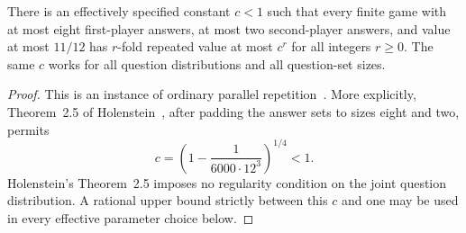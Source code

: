 \begin{theorem}\label{thm:parallel-repetition}
There is an effectively specified constant $c<1$ such that every finite game
with at most eight first-player answers, at most two second-player answers,
and value at most $11/12$ has $r$-fold repeated value at most $c^r$ for all
integers $r\ge0$. The same $c$ works for all question distributions and all
question-set sizes.
\end{theorem}
\begin{proof}
This is an instance of ordinary parallel repetition~\cite{Raz1998}.
More explicitly, Theorem~2.5 of Holenstein~\cite{Holenstein2009}, after padding
the answer sets to sizes eight and two, permits
\[
 c=\left(1-\frac1{6000\cdot12^3}\right)^{1/4}<1.
\]
Holenstein's Theorem~2.5 imposes no regularity condition on the joint question
distribution. A rational upper bound strictly between this $c$ and one may
be used in every effective parameter choice below.
\end{proof}
